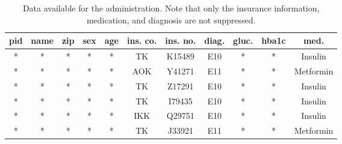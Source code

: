 \begin{table}[ht]
    \begin{center}
    \footnotesize{
        \renewcommand{\arraystretch}{1.5}
        \begin{tabular}{ | c | c | c | c | c | c | c | c | c | c | c | } 
            \hline
            \cellcolor{lightred} pid & \cellcolor{lightred} name & \cellcolor{lightred} zip & \cellcolor{lightred} sex & \cellcolor{lightred} age & ins. co. & ins. no. & diag. & \cellcolor{lightred} gluc. & \cellcolor{lightred} hba1c & med. \\
            \hline
            \cellcolor{lightred} * & \cellcolor{lightred} * & \cellcolor{lightred} * & \cellcolor{lightred} * & \cellcolor{lightred} * & TK & K15489 & E10 & \cellcolor{lightred} * & \cellcolor{lightred} * & Insulin \\
            \hline
            \cellcolor{lightred} * & \cellcolor{lightred} * & \cellcolor{lightred} * & \cellcolor{lightred} * & \cellcolor{lightred} * & AOK & Y41271 & E11 & \cellcolor{lightred} * & \cellcolor{lightred} * & Metformin \\
            \hline 
            \cellcolor{lightred} * & \cellcolor{lightred} * & \cellcolor{lightred} * & \cellcolor{lightred} * & \cellcolor{lightred} * & TK & Z17291 & E10 & \cellcolor{lightred} * & \cellcolor{lightred} * & Insulin \\
            \hline
            \cellcolor{lightred} * & \cellcolor{lightred} * & \cellcolor{lightred} * & \cellcolor{lightred} * & \cellcolor{lightred} * & TK & I79435 & E10 & \cellcolor{lightred} * & \cellcolor{lightred} * & Insulin \\
            \hline
            \cellcolor{lightred} * & \cellcolor{lightred} * & \cellcolor{lightred} * & \cellcolor{lightred} * & \cellcolor{lightred} * & IKK & Q29751 & E10 & \cellcolor{lightred} * & \cellcolor{lightred} * & Insulin \\
            \hline
            \cellcolor{lightred} * & \cellcolor{lightred} * & \cellcolor{lightred} * & \cellcolor{lightred} * & \cellcolor{lightred} * & TK & J33921 & E11 & \cellcolor{lightred} * & \cellcolor{lightred} * & Metformin \\
            \hline
        \end{tabular}
    }
    \caption{Data available for the administration. Note that only the insurance information, medication, and diagnosis are not suppressed.}
    \label{table:administration}
    \end{center}
\end{table}

